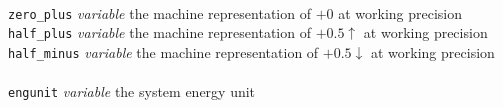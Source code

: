 \begin{tabbing}
\>                   \>                    \> \\
\> {\tt zero\_plus}  \> {\em variable}     \> the machine representation of $+0$ at working precision \\
\> {\tt half\_plus}  \> {\em variable}     \> the machine representation of $+0.5\uparrow$ at working precision \\
\> {\tt half\_minus} \> {\em variable}     \> the machine representation of $+0.5\downarrow$ at working precision \\
\>                   \>                    \> \\
\> {\tt engunit}     \> {\em variable}     \> the system energy unit \\
\end{tabbing}
